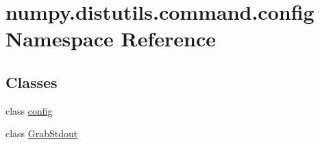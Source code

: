 \hypertarget{namespacenumpy_1_1distutils_1_1command_1_1config}{}\section{numpy.\+distutils.\+command.\+config Namespace Reference}
\label{namespacenumpy_1_1distutils_1_1command_1_1config}
\subsection*{Classes}
\begin{DoxyCompactItemize}
\item 
class \hyperlink{classnumpy_1_1distutils_1_1command_1_1config_1_1config}{config}
\item 
class \hyperlink{classnumpy_1_1distutils_1_1command_1_1config_1_1GrabStdout}{Grab\+Stdout}
\end{DoxyCompactItemize}
